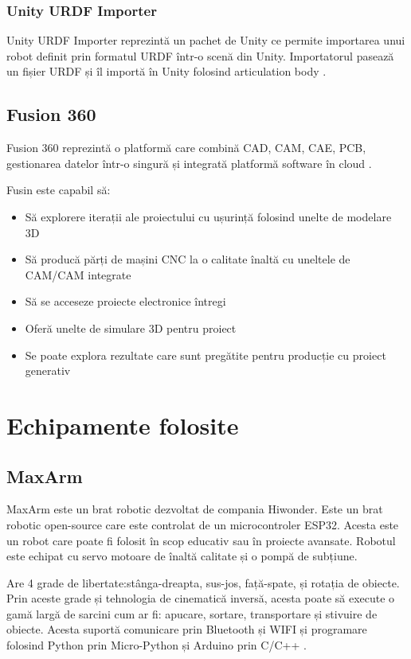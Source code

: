 \subsubsection{Unity URDF Importer}
Unity URDF Importer reprezintă un pachet de Unity ce permite importarea unui robot definit prin formatul URDF într-o scenă din Unity. Importatorul pasează un fișier URDF și îl importă în Unity folosind articulation body \cite{UU}.

\subsection{Fusion 360}
Fusion 360 reprezintă o platformă care combină CAD, CAM, CAE, PCB, gestionarea datelor într-o singură și integrată platformă software în cloud \cite{Fusion}.

Fusin este capabil să:
\begin{itemize}
	\item Să explorere iterații ale proiectului cu ușurință folosind unelte de modelare 3D \cite{Fusion}
	\item Să producă părți de mașini CNC la o calitate înaltă cu uneltele de CAM/CAM integrate \cite{Fusion}
	\item Să se acceseze proiecte electronice întregi \cite{Fusion}
	\item Oferă unelte de simulare 3D pentru proiect \cite{Fusion}
	\item Se poate explora rezultate care sunt pregătite pentru producție cu proiect generativ  \cite{Fusion}
\end{itemize}

\section{Echipamente folosite}

\subsection{MaxArm}

MaxArm este un brat robotic dezvoltat de compania Hiwonder. Este un brat robotic open-source care este controlat de un microcontroler ESP32. Acesta este un robot care poate fi folosit în scop educativ sau în proiecte avansate. Robotul este echipat cu servo motoare de înaltă calitate și o pompă de subțiune. 

Are 4 grade de libertate:stânga-dreapta, sus-jos, față-spate, și rotația de obiecte. Prin aceste grade și tehnologia de cinematică inversă, acesta poate să execute o gamă largă de sarcini cum ar fi: apucare, sortare, transportare și stivuire de obiecte. Acesta suportă comunicare prin Bluetooth și WIFI și programare folosind Python prin Micro-Python și Arduino prin C/C++ \cite{MaxArm}. 

